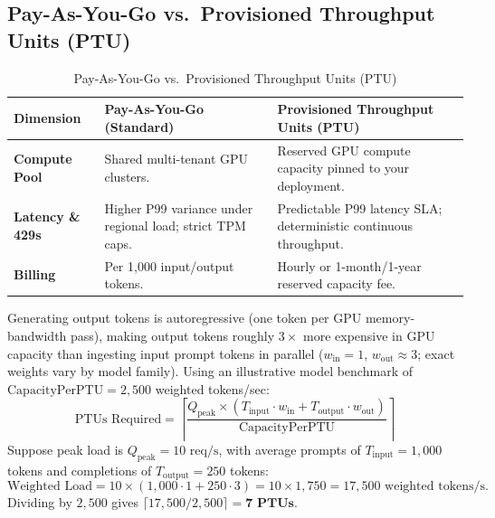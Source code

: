 \subsection{Pay-As-You-Go vs.\ Provisioned Throughput Units (PTU)}
\begin{table}[htbp]
\centering\small
\begin{tabular}{lp{6.0cm}p{6.0cm}}
\toprule
\textbf{Dimension} & \textbf{Pay-As-You-Go (Standard)} & \textbf{Provisioned Throughput Units (PTU)} \\
\midrule
\textbf{Compute Pool} & Shared multi-tenant GPU clusters. & Reserved GPU compute capacity pinned to your deployment. \\
\textbf{Latency \& 429s} & Higher P99 variance under regional load; strict TPM caps. & Predictable P99 latency SLA; deterministic continuous throughput. \\
\textbf{Billing} & Per 1,000 input/output tokens. & Hourly or 1-month/1-year reserved capacity fee. \\
\bottomrule
\end{tabular}
\caption{Pay-As-You-Go vs.\ Provisioned Throughput Units (PTU)}
\label{tab:v3-ch08-ptu}
\end{table}

\begin{underthehoodbox}
Generating output tokens is autoregressive (one token per GPU memory-bandwidth pass), making output tokens roughly $3\times$ more expensive in GPU capacity than ingesting input prompt tokens in parallel ($w_{\text{in}} = 1$, $w_{\text{out}} \approx 3$; exact weights vary by model family). Using an illustrative model benchmark of $\text{CapacityPerPTU} = 2{,}500$ weighted tokens/sec:
\begin{equation}
\text{PTUs Required} = \left\lceil \frac{Q_{\text{peak}} \times \left( T_{\text{input}} \cdot w_{\text{in}} + T_{\text{output}} \cdot w_{\text{out}} \right)}{\text{CapacityPerPTU}} \right\rceil
\end{equation}
Suppose peak load is $Q_{\text{peak}} = 10\text{ req/s}$, with average prompts of $T_{\text{input}} = 1{,}000$ tokens and completions of $T_{\text{output}} = 250$ tokens:
\begin{equation*}
\text{Weighted Load} = 10 \times (1{,}000 \cdot 1 + 250 \cdot 3) = 10 \times 1{,}750 = 17{,}500\text{ weighted tokens/s}.
\end{equation*}
Dividing by $2{,}500$ gives $\lceil 17{,}500 / 2{,}500 \rceil = \mathbf{7\text{ PTUs}}$.
\end{underthehoodbox}

